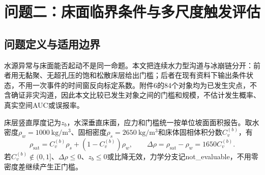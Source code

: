\section{问题二：床面临界条件与多尺度触发评估}
\subsection{问题定义与适用边界}
水源异常与床面能否起动不是同一命题。本文把连续水力型沟道与冰崩链分开：前者用无黏聚、无超孔压的饱和松散床层给出门槛；后者在现有资料下输出条件状态，不用一次事件的时间窗反向标定系数。附件6的84个对象均为已发生灾点，不含确证非灾沟道，因此本文比较已发生对象之间的门槛和规模，不估计发生概率、真实空间AUC或误报率。

床层竖直厚度记为$z_b$，水深垂直床面，应力和门槛统一按单位坡面面积报告。取水密度$\rho_w=1000\ \mathrm{kg/m^3}$、固相密度$\rho_s=2650\ \mathrm{kg/m^3}$和床体固相体积分数$C_v^{(b)}$，有
\begin{equation}
\rho_{\mathrm{sat}}=C_v^{(b)}\rho_s+(1-C_v^{(b)})\rho_w,
\qquad
\Delta\rho=\rho_{\mathrm{sat}}-\rho_w=1650C_v^{(b)}.
\end{equation}
若$C_v^{(b)}\notin(0,1]$、$\Delta\rho\le0$、$z_b\le0$或比降无效，力学分支记not\_evaluable，不用零密度差继续产生正门槛。

